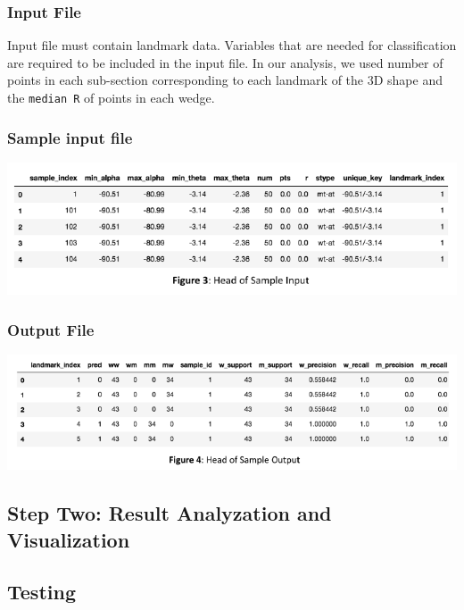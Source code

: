 \documentclass[10pt,letterpaper]{article}
\begin{document}
\subsubsection{Input File}\label{input-file}

Input file must contain landmark data. Variables that are needed for
classification are required to be included in the input file. In our
analysis, we used number of points in each sub-section corresponding to
each landmark of the 3D shape and the \texttt{median\ R} of points in
each wedge.

\subsubsection{Sample input file}\label{sample-input-file}

\includegraphics{zebrafish_paper_files/figure-latex/unnamed-chunk-4-1.pdf}

\subsubsection{Output File}\label{output-file}

\includegraphics{zebrafish_paper_files/figure-latex/unnamed-chunk-5-1.pdf}

\subsection{Step Two: Result Analyzation and
Visualization}\label{step-two-result-analyzation-and-visualization}

\subsection{Testing}\label{testing}
\end{document}

